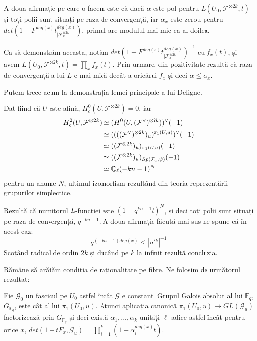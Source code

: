 \documentclass[13pt,openany]{book}
\begin{document}
A doua afirmație pe care o facem este că dacă $\alpha$ este pol pentru $L(U_0,\mathcal{F}^{\otimes 2k},t)$ și toți polii sunt situați pe raza de convergență, iar $\alpha_x$ este zerou pentru $det(1-F^{deg(x)}t^{deg(x)}_{\mid\mathcal{F}^{\otimes 2k}_x})$, primul are modulul mai mic ca al doilea.

Ca să demonstrăm aceasta, notăm $det(1-F^{deg(x)}t^{deg(x)}_{\mid\mathcal{F}^{\otimes 2k}_x})^{-1}$ cu $f_x(t)$, și avem $L(U_0,\mathcal{F}^{\otimes 2k},t)=\prod_x f_x(t)$. Prin urmare, din pozitivitate rezultă că raza de convergență a lui $L$ e mai mică decât a oricărui $f_x$ și deci $\alpha\leq\alpha_x$.

Putem trece acum la demonstrația lemei principale a lui Deligne.

Dat fiind că $U$ este afină, $H^0_c(U,\mathcal{F}^{\otimes 2k})=0$, iar
\begin{align*}
H^2_c(U,\mathcal{F}^{\otimes 2k}) &\simeq (H^0(U,(\mathcal{F}^{\vee})^{\otimes 2k}))^{\vee}(-1)\\
&\simeq ((((\mathcal{F}^\vee)^{\otimes 2k})_u)^{\pi_1(U,u)})^{\vee}(-1)\\
&\simeq ((\mathcal{F}^{\otimes 2k})_u)_{\pi_1(U,u)}(-1)\\
&\simeq ((\mathcal{F}^{\otimes 2k})_u)_{Sp(\mathcal{F}_u,\psi)}(-1)\\
&\simeq \mathbb{Q}_\ell(-kn-1)^N
\end{align*}
pentru un anume $N$, ultimul izomorfism rezultând din teoria reprezentării grupurilor simplectice.

Rezultă că numitorul $L$-funcției este $(1-q^{kn+1}t)^N$, și deci toți polii sunt situați pe raza de convergență, $q^{-kn-1}$. A doua afirmație făcută mai sus ne spune că în acest caz:
$$q^{(-kn-1)deg(x)}\leq|a^{2k}|^{-1}$$
Scoțând radical de ordin $2k$ și ducând pe $k$ la infinit rezultă concluzia.

Rămâne să arătăm condiția de raționalitate pe fibre. Ne folosim de următorul rezultat:

\begin{lema}
Fie $\mathcal{G}_0$ un fascicul pe $U_0$ astfel încât $\mathcal{G}$ e constant. Grupul Galois absolut al lui $\mathbb{F}_q$, $G_{\mathbb{F}_q}$, este cât al lui $\pi_1(U_0,u)$. Atunci aplicația canonică $\pi_1(U_0,u) \rightarrow GL(\mathcal{G}_u)$ factorizează prin $G_{\mathbb{F}_q}$ și deci există $\alpha_1,...,\alpha_k$ unități $\ell$-adice astfel încât pentru orice $x$, $det(1-tF_x, \mathcal{G}_u)=\prod_{i=1}^k (1-\alpha_i^{deg(x)}t)$.
\end{lema}
\end{document}
